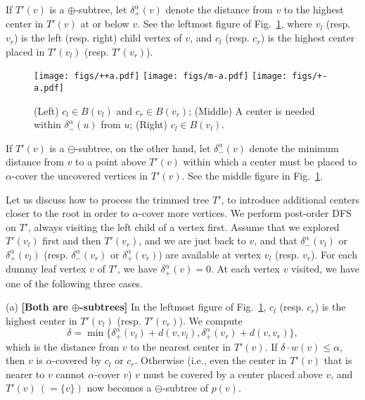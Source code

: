 \documentclass{llncs}
\begin{document}
{If $T'(v)$ is a $\oplus$-subtree,
let $\delta_+^{\alpha}(v)$ denote the distance from $v$ to the highest center in $T'(v)$
at or below $v$.
See the leftmost figure of Fig.~\ref{fig:covering1},
where $v_l$ (resp. $v_r$) is the left (resp. right) child vertex of $v$,
and $c_l$ (resp. $c_r$) is the highest center placed in $T'(v_l)$ (resp. $T'(v_r)$).
\begin{figure}[ht]
\centering
\texttt{[image: figs/++a.pdf]}
\hspace{8mm}
\texttt{[image: figs/m-a.pdf]}
\hspace{8mm}
\texttt{[image: figs/+-a.pdf]}
\caption{(Left) $c_l\in B(v_l)$ and $c_r\in B(v_r)$; 
(Middle) A center is needed within $\delta_-^{\alpha}(u)$ from $u$;
(Right) $c_l\in B(v_l)$.
}
\label{fig:covering1}
\end{figure}
If $T'(v)$ is a $\ominus$-subtree,
on the other hand,
let $\delta_-^{\alpha}(v)$ denote the minimum distance from $v$ to a point above $T'(v)$
within which a center must be placed to $\alpha$-cover the uncovered vertices in $T'(v)$.
See the middle figure in Fig.~\ref{fig:covering1}.


Let us discuss how to process the trimmed tree $T'$,
to introduce additional centers closer to the root in order to $\alpha$-cover more vertices.
We perform post-order DFS on $T'$,
always visiting the left child of a vertex first.
Assume that we explored $T'(v_l)$ first and then $T'(v_r)$,
and we are just back to $v$,
and that $\delta_-^{\alpha}(v_l)$ or $\delta_+^{\alpha}(v_l)$ (resp. $\delta_-^{\alpha}(v_r)$ or $\delta_+^{\alpha}(v_r)$)
are available at vertex $v_l$ (resp. $v_r$).
For each dummy leaf vertex $v$ of $T'$,
we have $\delta_+^{\alpha}(v)=0$.
At each vertex $v$ visited, we have one of the following three cases.

(a) {\bf [Both are $\oplus$-subtrees]}
In the leftmost figure of Fig.~\ref{fig:covering1},
$c_l$ (resp. $c_r$) is the highest center in $T'(v_l)$ (resp. $T'(v_r)$).
We compute 
\begin{equation}\label{eqn:updateDelta+}
\delta=\min \{\delta_+^{\alpha}(v_l)+ d(v,v_l),\delta_+^{\alpha}(v_r)+ d(v,v_r)\},
\end{equation}
which is the distance from $v$ to the nearest center in $T'(v)$.
If $\delta\cdot w(v) \leq \alpha$,
then $v$ is $\alpha$-covered by $c_l$ or $c_r$. 
Otherwise (i.e., even the center in $T'(v)$ that is nearer to $v$ cannot $\alpha$-cover $v$)
$v$ must be covered by a center placed above $v$,
and $T'(v)~(=\{v\})$ now becomes a $\ominus$-subtree of $p(v)$.

}
\end{document}
